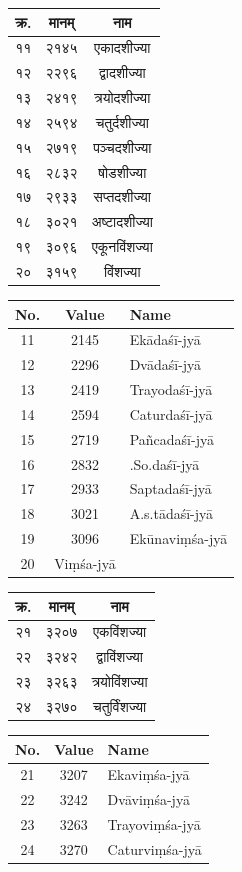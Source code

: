 \documentclass[11pt,a4paper]{book}
\newcommand{\bilingual}[2]{%
  \par\vspace{0.6em}%
  \noindent\begin{minipage}[t]{0.48\textwidth}
    \RaggedRight
    #1%
  \end{minipage}%
  \hfill
  \begin{minipage}[t]{0.48\textwidth}
    \RaggedRight
    #2%
  \end{minipage}%
  \par\vspace{0.6em}%
}
\begin{document}
\bilingual{%
\begin{tabular}{|c|c|c|}
\hline
क्र. & मानम्‌ & नाम \\
\hline
११ & २१४५ & एकादशीज्या \\
१२ & २२९६ & द्वादशीज्या \\
१३ & २४१९ & त्रयोदशीज्या \\
१४ & २५९४ & चतुर्दशीज्या \\
१५ & २७१९ & पञ्चदशीज्या \\
१६ & २८३२ & षोडशीज्या \\
१७ & २९३३ & सप्तदशीज्या \\
१८ & ३०२१ & अष्टादशीज्या \\
१९ & ३०९६ & एकूनविंशज्या \\
२० & ३१५९ & विंशज्या \\
\hline
\end{tabular}
}{%
\begin{tabular}{|c|c|l|}
\hline
No. & Value & Name \\
\hline
11 & 2145 & Ekādaśī-jyā \\
12 & 2296 & Dvādaśī-jyā \\
13 & 2419 & Trayodaśī-jyā \\
14 & 2594 & Caturdaśī-jyā \\
15 & 2719 & Pañcadaśī-jyā \\
16 & 2832 & .So.daśī-jyā \\
17 & 2933 & Saptadaśī-jyā \\
18 & 3021 & A.s.tādaśī-jyā \\
19 & 3096 & Ekūnaviṃśa-jyā \\
20 & Viṃśa-jyā \\
\hline
\end{tabular}
}

\bilingual{%
\begin{tabular}{|c|c|c|}
\hline
क्र. & मानम्‌ & नाम \\
\hline
२१ & ३२०७ & एकविंशज्या \\
२२ & ३२४२ & द्वाविंशज्या \\
२३ & ३२६३ & त्रयोविंशज्या \\
२४ & ३२७० & चतुर्विंशज्या \\
\hline
\end{tabular}
}{%
\begin{tabular}{|c|c|l|}
\hline
No. & Value & Name \\
\hline
21 & 3207 & Ekaviṃśa-jyā \\
22 & 3242 & Dvāviṃśa-jyā \\
23 & 3263 & Trayoviṃśa-jyā \\
24 & 3270 & Caturviṃśa-jyā \\
\hline
\end{tabular}
}
\end{document}
